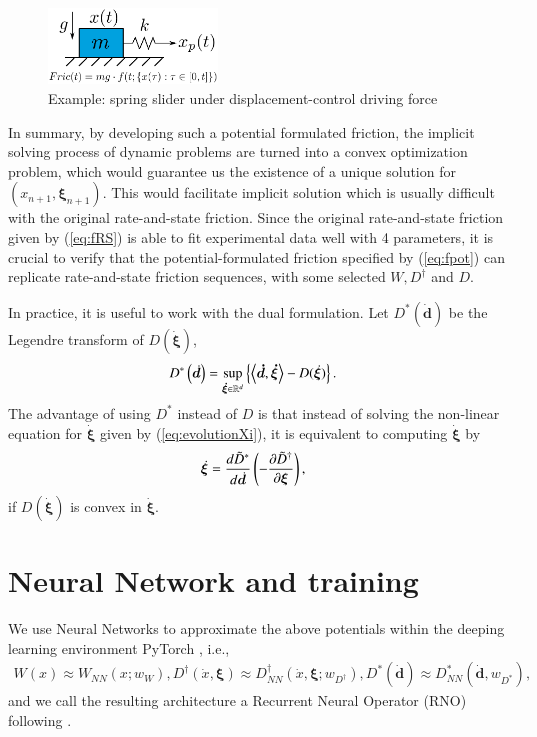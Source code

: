 \begin{figure}
    \centering
    \includegraphics[width=0.4\textwidth]{figures/SpringSlider.pdf}
    \caption{Example: spring slider under displacement-control driving force}
    \label{fig:springslider}
\end{figure}

In summary, 
by developing such a potential formulated friction, 
the implicit solving process of dynamic problems are turned into a convex optimization problem, 
which would guarantee us the existence of a unique solution for $(x_{n+1}, \bm{\xi}_{n+1})$. 
This would facilitate implicit solution which is usually difficult with the original rate-and-state friction. 
Since the original rate-and-state friction given by (\ref{eq:fRS}) is able to fit experimental data well with 4 parameters, 
it is crucial to verify that the potential-formulated friction specified by (\ref{eq:fpot}) can replicate rate-and-state friction sequences, 
with some selected $W, D^\dagger$ and $D$. 

In practice, 
it is useful to work with the dual formulation. 
Let $D^*(\bm{\dot{d}})$ be the Legendre transform of $D(\bm{\dot{\xi}})$, 
\begin{align}
    D^*\left(\dot{\bm{d}}\right) &= \sup_{\bm{\dot{\xi}} \in \mathbb{R}^d} \left\{\left\langle \bm{\dot{d}}, \bm{\dot{\xi}} \right\rangle -D(\dot{\bm{\xi}})\right\}. \label{eq:LegendreDstar}
\end{align} 
The advantage of using $D^*$ instead of $D$ is that instead of solving the non-linear equation for $\dot{\bm{\xi}}$ given by (\ref{eq:evolutionXi}), 
it is equivalent to computing $\dot{\bm{\xi}}$ by 
\begin{align}
    \dot{\bm{\xi}} &= \frac{d \Tilde{D}^*}{d \dot{\bm{d}}}\left(-\frac{\partial \Tilde{D}^\dagger}{\partial \bm{\xi}}\right) \label{eq:ComputeXiDot}, 
\end{align}
if $D\left(\bm{\dot{\xi}}\right)$ is convex in $\bm{\dot{\xi}}$. 


\section{Neural Network and training}
\label{sec:NN}
We use Neural Networks to approximate the above potentials within the deeping learning environment PyTorch \cite{paszke2019pytorch}, i.e., 
\begin{align}
    W(x) \approx W_{NN}(x; w_W), 
    D^\dagger(\dot{x}, \bm{\xi}) \approx D^\dagger_{NN}(\dot{x}, \bm{\xi}; w_{D^\dagger}), 
    D^*\left(\dot{\bm{d}}\right) \approx D^*_{NN}\left(\dot{\bm{d}}, w_{D^*}\right)\label{eq:NNpotentials},  
\end{align}
and we call the resulting architecture a Recurrent Neural Operator (RNO) following \cite{BurigedeEric2023, BurigedeMarkovian2023}. 

